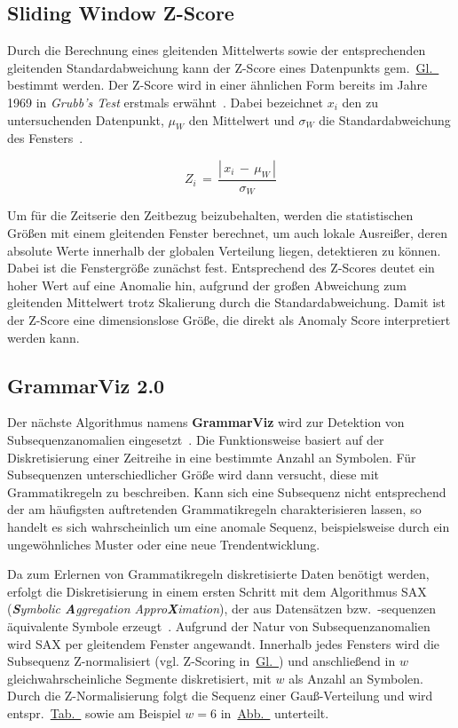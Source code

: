 \subsection{Sliding Window Z-Score}
Durch die Berechnung eines gleitenden Mittelwerts sowie der entsprechenden gleitenden Standardabweichung kann der Z-Score eines Datenpunkts
gem.~\hyperref[eq:zscore]{Gl.~} bestimmt werden. Der Z-Score wird in einer ähnlichen Form bereits im Jahre 1969 in \textit{Grubb's
Test} erstmals erwähnt~\cite{Grubbs1969}. Dabei bezeichnet $x_i$ den zu untersuchenden Datenpunkt, $\mu_W$ den Mittelwert und $\sigma_W$ die
Standardabweichung des Fensters~\Cite[S.~15:31]{Chandola2009}.

\begin{equation}
    Z_i\, =\, \frac{|\, x_i\,-\, \mu_W\,|}{\sigma_W}
\label{eq:zscore}
\end{equation}

Um für die Zeitserie den Zeitbezug beizubehalten, werden die statistischen Größen mit einem gleitenden Fenster berechnet, um auch lokale Ausreißer,
deren absolute Werte innerhalb der globalen Verteilung liegen, detektieren zu können. Dabei ist die Fenstergröße zunächst fest. Entsprechend des
Z-Scores deutet ein hoher Wert auf eine Anomalie hin, aufgrund der großen Abweichung zum gleitenden Mittelwert trotz Skalierung durch die
Standardabweichung. Damit ist der Z-Score eine dimensionslose Größe, die direkt als Anomaly Score interpretiert werden kann.

\subsection{GrammarViz 2.0}
Der nächste Algorithmus namens \textbf{GrammarViz} wird zur Detektion von Subsequenzanomalien eingesetzt~\cite{Senin2015}. Die Funktionsweise
basiert auf der Diskretisierung einer Zeitreihe in eine bestimmte Anzahl an Symbolen. Für Subsequenzen unterschiedlicher Größe wird dann versucht, diese mit
Grammatikregeln zu beschreiben. Kann sich eine Subsequenz nicht entsprechend der am häufigsten auftretenden Grammatikregeln charakterisieren
lassen, so handelt es sich wahrscheinlich um eine anomale Sequenz, beispielsweise durch ein ungewöhnliches Muster oder eine neue Trendentwicklung.

Da zum Erlernen von Grammatikregeln diskretisierte Daten benötigt werden, erfolgt die Diskretisierung in einem ersten Schritt mit dem Algorithmus SAX
(\textit{\textbf{S}ymbolic \textbf{A}ggregation Appro\textbf{X}imation}), der aus Datensätzen bzw.~-sequenzen äquivalente Symbole erzeugt~\cite{Patel}.
Aufgrund der Natur von Subsequenzanomalien wird SAX per gleitendem Fenster angewandt. Innerhalb jedes Fensters wird die Subsequenz Z-normalisiert (vgl.
Z-Scoring in~\hyperref[eq:zscore]{Gl.~}) und anschließend in $w$ gleichwahrscheinliche Segmente diskretisiert, mit $w$ als Anzahl an
Symbolen. Durch die Z-Normalisierung folgt die Sequenz einer Gauß-Verteilung und wird
entspr.~\hyperref[tab:normalverteilung_segmente]{Tab.~} sowie am Beispiel $w=6$
in~\hyperref[fig:normalverteilung_segmente]{Abb.~} unterteilt.


